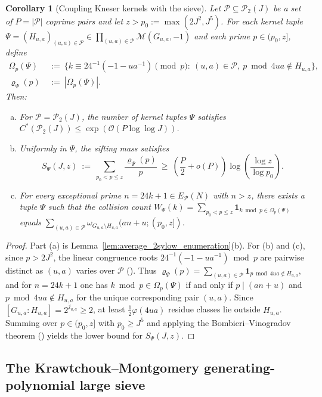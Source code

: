 \documentclass[11pt, a4paper]{article}
\theoremstyle{plain}
\newtheorem{corollary}[theorem]{Corollary}
\theoremstyle{definition}
\begin{document}
\begin{corollary}[Coupling Kneser kernels with the sieve]\label{cor:coupling_step1_step2}
Let $\mathcal{P}\subseteq\mathcal{P}_2(J)$ be a set of $P=|\mathcal{P}|$ coprime pairs and let $z>p_0:=\max(2J^{2},J^{5})$. For each kernel tuple $\Psi=(H_{u,a})_{(u,a)\in\mathcal{P}}\in\prod_{(u,a)\in\mathcal{P}}\mathcal{M}(G_{u,a},-1)$ and each prime $p\in(p_0,z]$, define
\[
\begin{aligned}
\Omega_p(\Psi)\ &:=\ \Big\{k\equiv 24^{-1}(-1-ua^{-1})\pmod p:\ (u,a)\in\mathcal{P},\ p\bmod 4ua\notin H_{u,a}\Big\},\\
\varrho_\Psi(p)\ &:=\ |\Omega_p(\Psi)|.
\end{aligned}
\]
Then:
\begin{enumerate}[(a)]
    \item For $\mathcal{P}=\mathcal{P}_2(J)$, the number of kernel tuples $\Psi$ satisfies $C^{\ast}(\mathcal{P}_2(J))\le\exp(\mathcal{O}(P\log\log J))$.
    \item Uniformly in $\Psi$, the sifting mass satisfies
    $$S_\Psi(J,z)\ :=\ \sum_{p_0<p\le z}\frac{\varrho_\Psi(p)}{p}\ \ge\ \left(\frac P2+o(P)\right)\log\!\left(\frac{\log z}{\log p_0}\right).$$
    \item For every exceptional prime $n=24k+1\in E_{\mathcal{P}}(N)$ with $n>z$, there exists a tuple $\Psi$ such that the collision count $W_\Psi(k)=\sum_{p_0<p\le z}\mathbf{1}_{k\bmod p\in\Omega_p(\Psi)}$ equals $\sum_{(u,a)\in\mathcal{P}}\omega_{G_{u,a}\setminus H_{u,a}}(an+u;(p_0,z])$.
\end{enumerate}
\end{corollary}
\begin{proof}
Part (a) is Lemma~\ref{lem:average_2sylow_enumeration}(b). For (b) and (c), since $p>2J^{2}$, the linear congruence roots $24^{-1}(-1-ua^{-1})\bmod p$ are pairwise distinct as $(u,a)$ varies over $\mathcal{P}$ (\cite[Lemma~4.1]{dahan2026a}). Thus $\varrho_\Psi(p)=\sum_{(u,a)\in\mathcal{P}}\mathbf{1}_{p\bmod 4ua\notin H_{u,a}}$, and for $n=24k+1$ one has $k\bmod p\in\Omega_p(\Psi)$ if and only if $p\mid(an+u)$ and $p\bmod 4ua\notin H_{u,a}$ for the unique corresponding pair $(u,a)$. Since $[G_{u,a}:H_{u,a}]=2^{j_{u,a}}\ge2$, at least $\frac12\varphi(4ua)$ residue classes lie outside $H_{u,a}$. Summing over $p\in(p_0,z]$ with $p_0\ge J^5$ and applying the Bombieri--Vinogradov theorem (\cite[Lemma~4.23]{dahan2026a}) yields the lower bound for $S_\Psi(J,z)$.
\end{proof}

\subsection{The Krawtchouk--Montgomery generating-polynomial large sieve}\label{subsec:generating_poly_ls}
\end{document}
